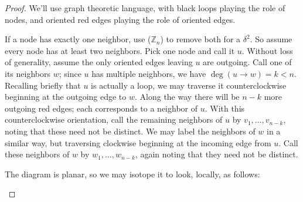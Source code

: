 \documentclass[pdflatex,sn-mathphys-num]{sn-jnl}%
\theoremstyle{thmstyleone}%
\theoremstyle{thmstyletwo}%
\theoremstyle{thmstylethree}%
\newcommand{\Z}{\mathbb{Z}}
\begin{document}
\begin{proof}
    We'll use graph theoretic language, with black loops playing the role of nodes,
    and oriented red edges playing the role of oriented edges.

    If a node has exactly one neighbor, use ($\Z_n$) to remove both for a $\delta^2$.
    So assume every node has at least two neighbors.
    Pick one node and call it $u$.
    Without loss of generality, assume the only oriented edges leaving $u$ are outgoing.
    Call one of its neighbors $w$;
    since $u$ has multiple neighbors, we have $\deg(u\to w)=k<n$.
    Recalling briefly that $u$ is actually a loop, we may traverse it counterclockwise
    beginning at the outgoing edge to $w$.
    Along the way there will be $n-k$ more outgoing red edges;
    each corresponds to a neighbor of $u$.
    With this counterclockwise orientation, call the remaining neighbors of $u$ by $v_1,\dots,v_{n-k}$, noting that
    these need not be distinct.
    We may label the neighbors of $w$ in a similar way, but traversing clockwise
    beginning at the incoming edge from $u$.
    Call these neighbors of $w$ by $w_1,\dots,w_{n-k}$, again noting that 
    they need not be distinct.

    The diagram is planar, so we may isotope it to look, locally, as follows:
    \begin{center}
\end{center}
\end{proof}
\end{document}
